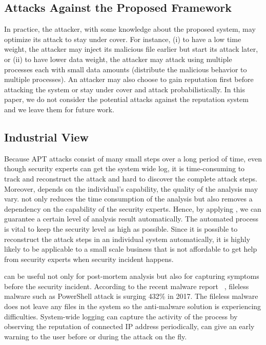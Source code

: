 \subsection{Attacks Against the Proposed Framework}
In practice, the attacker, with some knowledge about the proposed system, may optimize its attack to stay under cover. For instance, (i) to have a low time weight, the attacker may inject its malicious file earlier but start its attack later, or (ii) to have lower data weight, the attacker may attack using multiple processes each with small data amounts (\ie distribute the malicious behavior to multiple processes). An attacker may also choose to gain reputation first before attacking the system or stay under cover and attack probabilistically. In this paper, we do not consider the potential attacks against the reputation system and we leave them for future work.


\subsection{Industrial View}
Because APT attacks consist of many small steps over a long period of time, even though security experts can get the system wide log, it is time-consuming to track and reconstruct the attack and hard to discover the complete attack steps. Moreover, depends on the individual’s capability, the quality of the analysis may vary. \tool not only reduces the time consumption of the analysis but also removes a dependency on the capability of the security experts. Hence, by applying \tool, we can guarantee a certain level of analysis result automatically. The automated process is vital to keep the security level as high as possible. 
Since it is possible to reconstruct the attack steps in an individual system automatically, it is highly likely to be applicable to a small scale business that is not affordable to get help from security experts when security incident happens.

\tool can be useful not only for post-mortem analysis but also for capturing symptoms before the security incident. According to the recent malware report ~\cite{McAfeeLabs:2018report}, fileless malware such as PowerShell attack is surging 432\% in 2017. The fileless malware does not leave any files in the system so the anti-malware solution is experiencing difficulties. System-wide logging can capture the activity of the process by observing the reputation of connected IP address periodically, \tool can give an early warning to the user before or during the attack on the fly.


